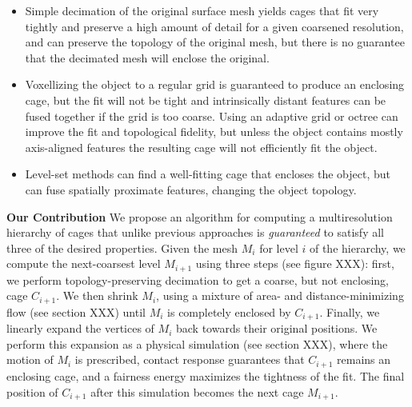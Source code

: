 \begin{itemize}
\item Simple decimation of the original surface mesh yields cages that fit very
tightly and preserve a high amount of detail for a given coarsened resolution,
and can preserve the topology of the original mesh, but there is no guarantee
that the decimated mesh will enclose the original.
\item Voxellizing the object to a regular grid is guaranteed to produce an
enclosing cage, but the fit will not be tight and intrinsically distant
features can be fused together if the grid is too coarse. Using an adaptive
grid or octree can improve the fit and topological fidelity, but unless the
object contains mostly axis-aligned features the resulting cage will not
efficiently fit the object.
\item Level-set methods can find a well-fitting cage that encloses the object,
but can fuse spatially proximate features, changing the object topology.
\end{itemize}

\noindent\textbf{Our Contribution} We propose an algorithm for computing a
multiresolution hierarchy of cages that unlike previous approaches is
\emph{guaranteed} to satisfy all three of the desired properties. Given the
mesh $M_i$ for level $i$ of the hierarchy, we compute the next-coarsest level
$M_{i+1}$ using three steps (see figure XXX): first, we perform
topology-preserving decimation to get a coarse, but not enclosing, cage
$C_{i+1}$. We then shrink $M_i$, using a mixture of area- and
distance-minimizing flow (see section XXX) until $M_i$ is completely enclosed
by $C_{i+1}$. Finally, we linearly expand the vertices of $M_i$ back towards
their original positions. We perform this expansion as a physical simulation
(see section XXX), where the motion of $M_i$ is prescribed, contact response
guarantees that $C_{i+1}$ remains an enclosing cage, and a fairness energy
maximizes the tightness of the fit. The final position of $C_{i+1}$ after this
simulation becomes the next cage $M_{i+1}$.


